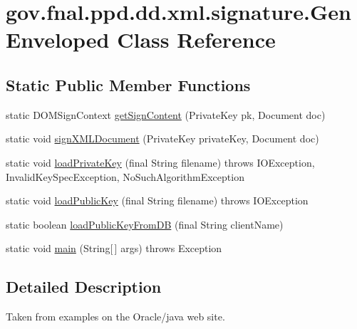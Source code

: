 \hypertarget{classgov_1_1fnal_1_1ppd_1_1dd_1_1xml_1_1signature_1_1GenEnveloped}{\section{gov.\-fnal.\-ppd.\-dd.\-xml.\-signature.\-Gen\-Enveloped Class Reference}
\label{classgov_1_1fnal_1_1ppd_1_1dd_1_1xml_1_1signature_1_1GenEnveloped}
}
\subsection*{Static Public Member Functions}
\begin{DoxyCompactItemize}
\item 
static D\-O\-M\-Sign\-Context \hyperlink{classgov_1_1fnal_1_1ppd_1_1dd_1_1xml_1_1signature_1_1GenEnveloped_a14df81eeaa8d9607d12ae959e4f45cff}{get\-Sign\-Content} (Private\-Key pk, Document doc)
\item 
static void \hyperlink{classgov_1_1fnal_1_1ppd_1_1dd_1_1xml_1_1signature_1_1GenEnveloped_a86010943e39ea4f238731c3b6890033e}{sign\-X\-M\-L\-Document} (Private\-Key private\-Key, Document doc)
\item 
static void \hyperlink{classgov_1_1fnal_1_1ppd_1_1dd_1_1xml_1_1signature_1_1GenEnveloped_a1537e34dda8980c9a83352b30895eb77}{load\-Private\-Key} (final String filename)  throws I\-O\-Exception, Invalid\-Key\-Spec\-Exception, No\-Such\-Algorithm\-Exception 
\item 
static void \hyperlink{classgov_1_1fnal_1_1ppd_1_1dd_1_1xml_1_1signature_1_1GenEnveloped_a5d97ac332f4ad0e9ef7051e77d3d6296}{load\-Public\-Key} (final String filename)  throws I\-O\-Exception 
\item 
static boolean \hyperlink{classgov_1_1fnal_1_1ppd_1_1dd_1_1xml_1_1signature_1_1GenEnveloped_a21b820b493c7ce4ba5cb8429112ab738}{load\-Public\-Key\-From\-D\-B} (final String client\-Name)
\item 
static void \hyperlink{classgov_1_1fnal_1_1ppd_1_1dd_1_1xml_1_1signature_1_1GenEnveloped_a16023580ac338dc85c74053b151ad680}{main} (String\mbox{[}$\,$\mbox{]} args)  throws Exception 
\end{DoxyCompactItemize}


\subsection{Detailed Description}
Taken from examples on the Oracle/java web site.

